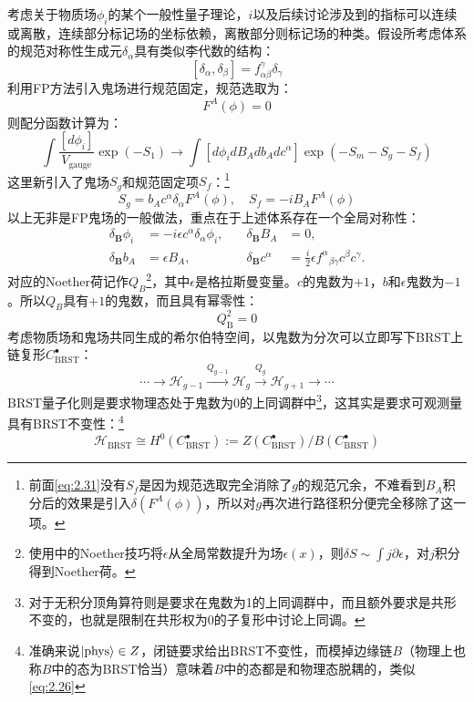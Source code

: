 考虑关于物质场$\phi_i$的某个一般性量子理论，$i$以及后续讨论涉及到的指标可以连续或离散，连续部分标记场的坐标依赖，离散部分则标记场的种类。假设所考虑体系的规范对称性生成元$\delta_\alpha$具有类似李代数的结构：
\begin{equation}
	\label{eq:2.41}
	[\delta_\alpha,\delta_\beta]=f_{\alpha\beta}^\gamma\delta_\gamma
\end{equation}
利用FP方法引入鬼场进行规范固定，规范选取为：
\begin{equation}
	F^A(\phi)=0
\end{equation}
则配分函数计算为：
\begin{equation}
	\int\frac{[d\phi_i]}{V_{\mathrm{gauge}}}\exp(-S_1)\to\int[d\phi_idB_Adb_Adc^\alpha]\exp(-S_m-S_g-S_f)
\end{equation}
这里新引入了鬼场$S_g$和规范固定项$S_f$：\footnote{前面\ref{eq:2.31}没有$S_f$是因为规范选取完全消除了$g$的规范冗余，不难看到$B_A$积分后的效果是引入$\delta(F^A(\phi))$，所以对$g$再次进行路径积分便完全移除了这一项。}
\begin{equation}
	S_g=b_Ac^\alpha\delta_\alpha F^A(\phi),\quad S_f=-iB_AF^A(\phi)
\end{equation}
以上无非是FP鬼场的一般做法，重点在于上述体系存在一个全局对称性：
\begin{equation}
	\begin{aligned}
		\delta_{\mathbf{B}}\phi_i 
		&= -i\epsilon c^\alpha\delta_\alpha\phi_i,  
		& \quad \delta_{\mathbf{B}}B_A 
		&= 0, \\
		\delta_{\mathbf{B}}b_{A} 
		&= \epsilon B_A,  
		& \quad \delta_{\mathbf{B}}c^{\alpha} 
		&= \frac{i}{2}\epsilon f^\alpha{}_{\beta\gamma} c^\beta c^\gamma.
	\end{aligned}
\end{equation}
对应的Noether荷记作$Q_B$\footnote{使用\cite{DiFrancesco:1997nk}中的Noether技巧将$\epsilon$从全局常数提升为场$\epsilon(x)$，则$\delta S\sim\int j\partial\epsilon$，对$j$积分得到Noether荷。}，其中$\epsilon$是格拉斯曼变量。$c$的鬼数为$+1$，$b$和$\epsilon$鬼数为$-1$。所以$Q_B$具有$+1$的鬼数，而且具有幂零性：
\begin{equation}
	Q_{\mathrm{B}}^2=0
\end{equation}
考虑物质场和鬼场共同生成的希尔伯特空间，以鬼数为分次可以立即写下BRST上链复形$C^{\bullet}_{\mathrm{BRST}}$：
\begin{equation}
	\cdots\longrightarrow\mathscr{H}_{g-1}\xrightarrow{Q_{g-1}}\mathscr{H}_g\xrightarrow{Q_g}\mathscr{H}_{g+1}\longrightarrow\cdots
\end{equation}
BRST量子化则是要求物理态处于鬼数为0的上同调群中\footnote{对于无积分顶角算符则是要求在鬼数为1的上同调群中，而且额外要求是共形不变的，也就是限制在共形权为0的子复形中讨论上同调。}，这其实是要求可观测量具有BRST不变性：\footnote{准确来说$\ket{\text{phys}}\in Z$，闭链要求给出BRST不变性，而模掉边缘链$B$（物理上也称$B$中的态为BRST恰当）意味着$B$中的态都是和物理态脱耦的，类似\ref{eq:2.26}}
\begin{equation}
	\label{eq:2.48}
	\mathscr{H}_{\mathrm{BRST}}\cong H^0(C^\bullet_{\mathrm{BRST}}):=Z(C^\bullet_{\mathrm{BRST}})/B(C^\bullet_{\mathrm{BRST}})
\end{equation}

